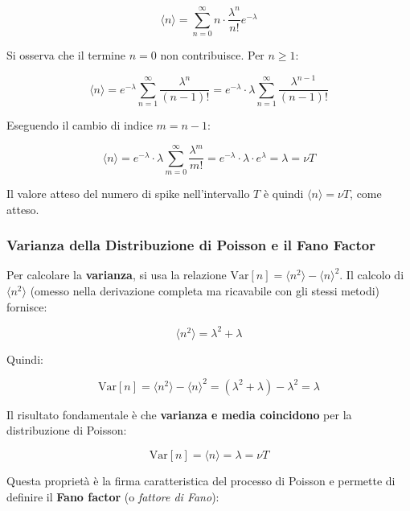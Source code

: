 \begin{equation}
\langle n \rangle = \sum_{n=0}^{\infty} n \cdot \frac{\lambda^n}{n!} e^{-\lambda}
\end{equation}

Si osserva che il termine $n=0$ non contribuisce. Per $n \geq 1$:

\begin{equation}
\langle n \rangle = e^{-\lambda} \sum_{n=1}^{\infty} \frac{\lambda^n}{(n-1)!} = e^{-\lambda} \cdot \lambda \sum_{n=1}^{\infty} \frac{\lambda^{n-1}}{(n-1)!}
\end{equation}

Eseguendo il cambio di indice $m = n-1$:

\begin{equation}
\langle n \rangle = e^{-\lambda} \cdot \lambda \sum_{m=0}^{\infty} \frac{\lambda^m}{m!} = e^{-\lambda} \cdot \lambda \cdot e^{\lambda} = \lambda = \nu T
\end{equation}

Il valore atteso del numero di spike nell'intervallo $T$ è quindi $\langle n \rangle = \nu T$, come atteso.

\subsubsection{Varianza della Distribuzione di Poisson e il Fano Factor}

Per calcolare la \textbf{varianza}, si usa la relazione $\text{Var}[n] = \langle n^2 \rangle - \langle n \rangle^2$. Il calcolo di $\langle n^2 \rangle$ (omesso nella derivazione completa ma ricavabile con gli stessi metodi) fornisce:

\begin{equation}
\langle n^2 \rangle = \lambda^2 + \lambda
\end{equation}

Quindi:

\begin{equation}
\text{Var}[n] = \langle n^2 \rangle - \langle n \rangle^2 = (\lambda^2 + \lambda) - \lambda^2 = \lambda
\end{equation}

Il risultato fondamentale è che \textbf{varianza e media coincidono} per la distribuzione di Poisson:

\begin{equation}
\text{Var}[n] = \langle n \rangle = \lambda = \nu T
\end{equation}

Questa proprietà è la firma caratteristica del processo di Poisson e permette di definire il \textbf{Fano factor} (o \textit{fattore di Fano}):

